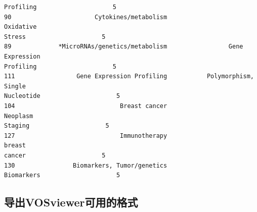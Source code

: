 \documentclass[11pt]{article}
\begin{document}
\begin{Verbatim}[commandchars=\\\{\}]
Profiling                     5
90                       Cytokines/metabolism                          Oxidative
Stress                     5
89             *MicroRNAs/genetics/metabolism                 Gene Expression
Profiling                     5
111                 Gene Expression Profiling           Polymorphism, Single
Nucleotide                     5
104                             Breast cancer                          Neoplasm
Staging                     5
127                             Immunotherapy                             breast
cancer                     5
130                Biomarkers, Tumor/genetics
Biomarkers                     5
    \end{Verbatim}

    \subsection{导出VOSviewer可用的格式}\label{ux5bfcux51favosviewerux53efux7528ux7684ux683cux5f0f}
\end{document}
